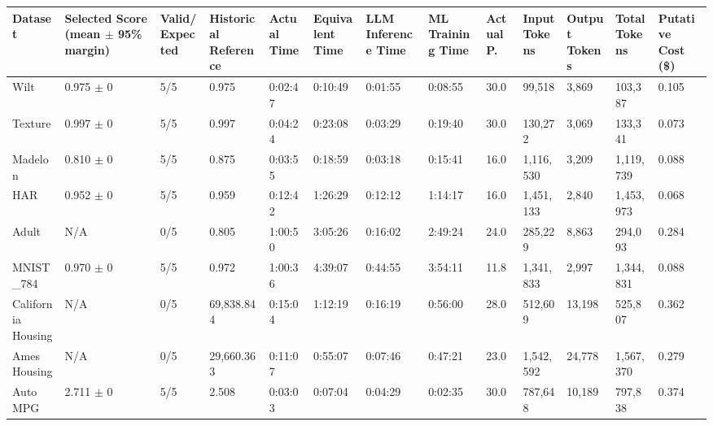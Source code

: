 \begin{tabular}{lllllllllllll}
\hline
Dataset & Selected Score (mean \ensuremath{\pm} 95\% margin) & Valid/Expected & Historical Reference & Actual Time & Equivalent Time & LLM Inference Time & ML Training Time & Actual P. & Input Tokens & Output Tokens & Total Tokens & Putative Cost (\$) \\
\hline
Wilt & 0.975 \ensuremath{\pm} 0 & 5/5 & 0.975 & 0:02:47 & 0:10:49 & 0:01:55 & 0:08:55 & 30.0 & 99,518 & 3,869 & 103,387 & 0.105 \\
Texture & 0.997 \ensuremath{\pm} 0 & 5/5 & 0.997 & 0:04:24 & 0:23:08 & 0:03:29 & 0:19:40 & 30.0 & 130,272 & 3,069 & 133,341 & 0.073 \\
Madelon & 0.810 \ensuremath{\pm} 0 & 5/5 & 0.875 & 0:03:55 & 0:18:59 & 0:03:18 & 0:15:41 & 16.0 & 1,116,530 & 3,209 & 1,119,739 & 0.088 \\
HAR & 0.952 \ensuremath{\pm} 0 & 5/5 & 0.959 & 0:12:42 & 1:26:29 & 0:12:12 & 1:14:17 & 16.0 & 1,451,133 & 2,840 & 1,453,973 & 0.068 \\
Adult & N/A & 0/5 & 0.805 & 1:00:50 & 3:05:26 & 0:16:02 & 2:49:24 & 24.0 & 285,229 & 8,863 & 294,093 & 0.284 \\
MNIST\_784 & 0.970 \ensuremath{\pm} 0 & 5/5 & 0.972 & 1:00:36 & 4:39:07 & 0:44:55 & 3:54:11 & 11.8 & 1,341,833 & 2,997 & 1,344,831 & 0.088 \\
California Housing & N/A & 0/5 & 69,838.844 & 0:15:04 & 1:12:19 & 0:16:19 & 0:56:00 & 28.0 & 512,609 & 13,198 & 525,807 & 0.362 \\
Ames Housing & N/A & 0/5 & 29,660.363 & 0:11:07 & 0:55:07 & 0:07:46 & 0:47:21 & 23.0 & 1,542,592 & 24,778 & 1,567,370 & 0.279 \\
Auto MPG & 2.711 \ensuremath{\pm} 0 & 5/5 & 2.508 & 0:03:03 & 0:07:04 & 0:04:29 & 0:02:35 & 30.0 & 787,648 & 10,189 & 797,838 & 0.374 \\
\hline
\end{tabular}
